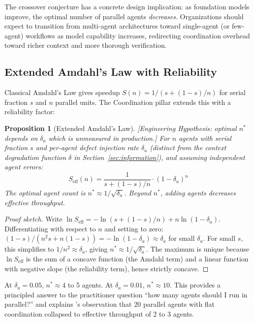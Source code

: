 \documentclass[11pt, a4paper]{googledeepmind}
\newtheorem{proposition}{Proposition}[section]
\begin{document}
The crossover conjecture has a concrete design implication: as foundation models improve, the optimal number of parallel agents \emph{decreases}. Organizations should expect to transition from multi-agent architectures toward single-agent (or few-agent) workflows as model capability increases, redirecting coordination overhead toward richer context and more thorough verification.

\subsection{Extended Amdahl's Law with Reliability}

Classical Amdahl's Law gives speedup $S(n) = 1/(s + (1-s)/n)$ for serial fraction $s$ and $n$ parallel units. The Coordination pillar extends this with a reliability factor:

\begin{proposition}[Extended Amdahl's Law]
\emph{[Engineering Hypothesis: optimal $n^*$ depends on $\delta_a$ which is unmeasured in production.]}
\label{thm:extended-amdahl}
For $n$ agents with serial fraction $s$ and per-agent defect injection rate $\delta_a$ (distinct from the context degradation function $\delta$ in Section~\ref{sec:information}), and assuming independent agent errors:
\begin{equation}
    S_{\text{eff}}(n) = \frac{1}{s + (1-s)/n} \cdot (1-\delta_a)^n
\end{equation}
The optimal agent count is $n^* \approx 1/\sqrt{\delta_a}$. Beyond $n^*$, adding agents \emph{decreases} effective throughput.
\end{proposition}

\begin{proof}[Proof sketch]
Write $\ln S_{\mathrm{eff}} = -\ln(s + (1-s)/n) + n \ln(1-\delta_a)$.
Differentiating with respect to $n$ and setting to zero:
$(1-s)/(n^2 s + n(1-s)) = -\ln(1-\delta_a) \approx \delta_a$ for small $\delta_a$.
For small $s$, this simplifies to $1/n^2 \approx \delta_a$, giving $n^* \approx 1/\sqrt{\delta_a}$.
The maximum is unique because $\ln S_{\mathrm{eff}}$ is the sum of a concave function (the Amdahl term) and a linear function with negative slope (the reliability term), hence strictly concave.
\end{proof}

At $\delta_a = 0.05$, $n^* \approx 4$ to 5 agents. At $\delta_a = 0.01$, $n^* \approx 10$. This provides a principled answer to the practitioner question ``how many agents should I run in parallel?'' and explains \citeauthor{Cursor2026}'s observation that 20 parallel agents with flat coordination collapsed to effective throughput of 2 to 3 agents.
\end{document}
